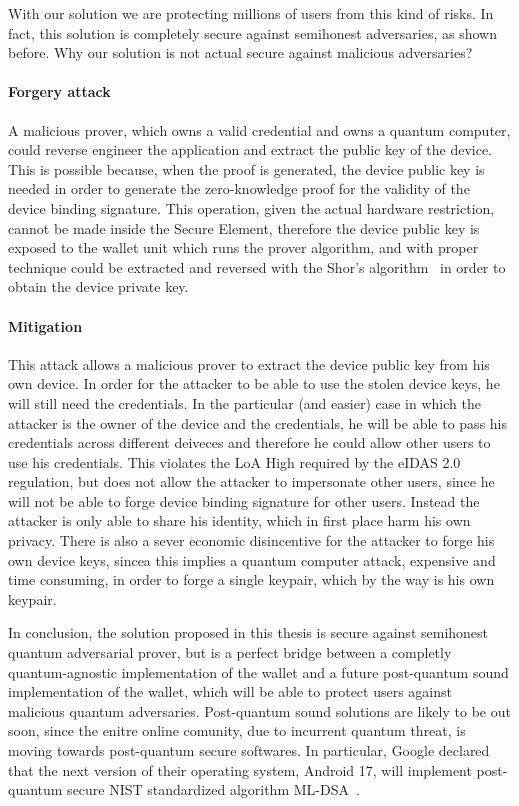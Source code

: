 \documentclass{article}
\begin{document}
With our solution we are protecting millions of users from this kind of risks. In fact, this solution is completely
secure against semihonest adversaries, as shown before.
Why our solution is not actual secure against malicious adversaries?

\paragraph{Forgery attack}
A malicious prover, which owns a valid credential and owns a quantum computer, could reverse engineer the application
and extract the public key of the device. This is possible because, when the proof is generated, the device public key
is needed in order to generate the zero-knowledge proof for the validity of the device binding signature. This operation,
given the actual hardware restriction, cannot be made inside the Secure Element, therefore the device public key is
exposed to the wallet unit which runs the prover algorithm, and with proper technique could be extracted and reversed
with the Shor's algorithm~\cite{Shor1997Polynomial} in order to obtain the device private key.

\paragraph{Mitigation}
This attack allows a malicious prover to extract the device public key from his own device.
In order for the attacker to be able to use the stolen device keys, he will still need the credentials.
In the particular (and easier) case in which the attacker is the owner of the device and the credentials,
he will be able to pass his credentials across different deiveces and therefore he could allow other
users to use his credentials. This violates the LoA High required by the eIDAS 2.0 regulation, but does
not allow the attacker to impersonate other users, since he will not be able to forge device binding signature
for other users. Instead the attacker is only able to share his identity, which in first place harm his own
privacy. There is also a sever economic disincentive for the attacker to forge his own device keys, sincea 
this implies a quantum computer attack, expensive and time consuming, in order to forge a single keypair,
which by the way is his own keypair.

In conclusion, the solution proposed in this thesis is secure against semihonest quantum adversarial prover,
but is a perfect bridge between a completly quantum-agnostic implementation of the wallet and a future
post-quantum sound implementation of the wallet, which will be able to protect users against malicious quantum adversaries.
Post-quantum sound solutions are likely to be out soon, since the enitre online comunity, due to incurrent quantum
threat, is moving towards post-quantum secure softwares. In particular, Google declared that the next version
of their operating system, Android 17, will implement post-quantum secure NIST standardized algorithm 
ML-DSA~\cite{Google2026SecurityQuantumAndroid}.
\end{document}
